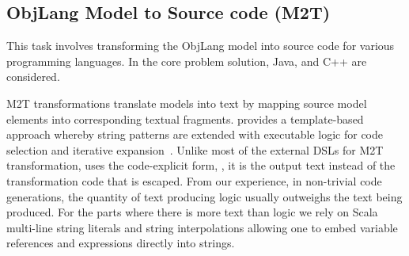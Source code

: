 \subsection{ObjLang Model to Source code (M2T)}

This task involves transforming the ObjLang model into source code for various programming languages.
In the core problem solution, Java, \Csharp and C++ are considered.

M2T transformations translate models into text by mapping source model elements into corresponding textual fragments.
\SIGMA provides a template-based approach whereby string patterns are extended with executable logic for code selection and iterative expansion~\cite{Czarnecki2006}.
Unlike most of the external DSLs for M2T transformation, \SIGMA uses the code-explicit form, \Ie, it is the output text instead of the transformation code that is escaped.
From our experience, in non-trivial code generations, the quantity of text producing logic usually outweighs the text being produced.
For the parts where there is more text than logic we rely on Scala multi-line string literals and string interpolations allowing one to embed variable references and expressions directly into strings.

